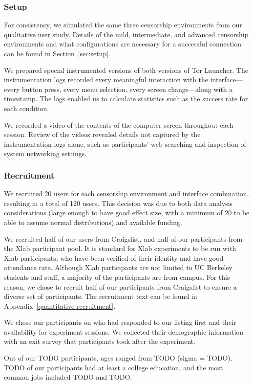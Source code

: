 \documentclass[USenglish,oneside,twocolumn]{article}
\begin{document}
\subsubsection{Setup}
For consistency, we simulated the same three censorship environments from 
our qualitative user study. Details of the mild, intermediate, and advanced 
censorship environments and what configurations are necessary for a 
successful connection can be found in Section~\ref{sec:setup}. 

We prepared special instrumented versions of both versions of Tor Launcher.
The instrumentation logs recorded every meaningful interaction with the interface---every
button press, every menu selection, every screen change---along with a timestamp.
The logs enabled us to calculate statistics such as the success rate
for each condition.

We recorded a video of the contents of the computer screen throughout each session.
Review of the videos revealed details not captured by the instrumentation logs alone,
such as participants' web searching and inspection of system networking settings.

\subsubsection{Recruitment}
We recruited 20 users for each censorship environment
and interface combination, resulting in a total of 120 users. This decision 
was due to both data analysis considerations (large enough to have good effect size, 
with a minimum of 20 to be able to assume normal distributions) and
available funding.

We recruited half of our users from Craigslist, and half of our participants from 
the Xlab participant pool. It is standard for Xlab experiments to be run with Xlab
participants, who have been verified of their identity and have good attendance
rate. Although Xlab participants are not limited to UC Berkeley students and staff,
a majority of the participants are from campus. For this reason, we chose to recruit 
half of our participants from Craigslist to ensure a diverse set of participants. 
The recruitment text can be found in Appendix~\ref{quantitative-recruitment}. 

We chose our participants on who had responded to our listing first and their
availability for experiment sessions. We collected their demographic information
with an exit survey that participants took after the experiment. 

Out of our {\color {red} TODO} participants, ages ranged from {\color {red} TODO}
(sigma = {\color {red} TODO}). {\color {red} TODO} of our participants had at least
a college education, and the most common jobs included {\color {red} TODO} and
{\color {red} TODO}. 
\end{document}
